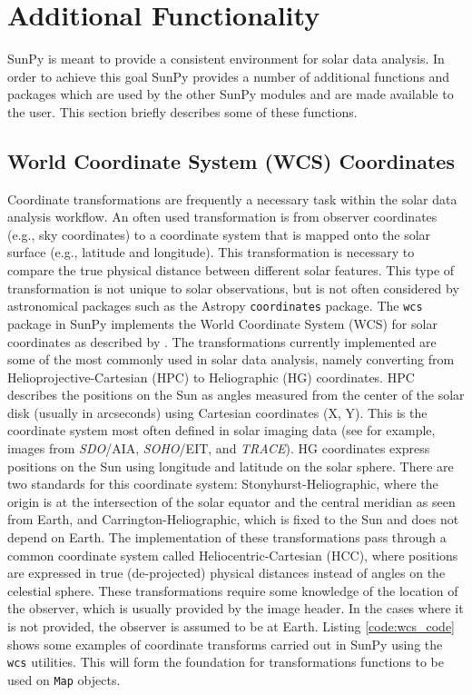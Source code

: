\section{Additional Functionality}\label{sec:util}
SunPy is meant to provide a consistent environment for solar data analysis. In 
order to achieve this goal SunPy provides a number of additional functions and packages which 
are used by the other SunPy modules and are made available to the user. This section 
briefly describes some of these functions.
	
\subsection{World Coordinate System (WCS) Coordinates}\label{ssec:util:wcs}
Coordinate transformations are frequently a necessary task within the solar 
data analysis workflow. An often used transformation is from 
observer coordinates (e.g., sky coordinates) to a coordinate system that is 
mapped onto the solar surface (e.g., latitude and longitude). This 
transformation is necessary to compare the true physical distance between 
different solar features. This type of transformation is not unique
to solar observations, but is not often considered by astronomical packages
such as the Astropy 
\texttt{coordinates} package. The \texttt{wcs} package in SunPy implements the World Coordinate 
System (WCS) for solar coordinates as described by \cite{thompson2006}. The 
transformations currently implemented are some of the most commonly used in solar data analysis, namely converting from Helioprojective-Cartesian 
(HPC) to Heliographic (HG) coordinates. HPC describes the positions on 
the Sun as angles measured from the center of the solar disk (usually in 
arcseconds) using Cartesian coordinates (X, Y). This is the coordinate system 
most often defined in solar imaging data (see for example, images from 
\textit{SDO}/AIA, \textit{SOHO}/EIT, and \textit{TRACE}). 
HG coordinates express positions on the Sun using longitude and latitude on 
the solar sphere. There are two standards for this coordinate system:
Stonyhurst-Heliographic, where the origin is at the intersection of the solar 
equator and the central meridian as seen from Earth, and 
Carrington-Heliographic, which is fixed to the Sun and does not depend on Earth. The 
implementation of these transformations pass through a common coordinate system 
called Heliocentric-Cartesian (HCC), where positions are expressed in true 
(de-projected) physical distances instead of angles on the celestial sphere.
These transformations require some knowledge of the location of the observer, 
which is usually provided by the image header. In the cases where it is 
not provided, the observer is assumed to be at Earth. Listing \ref{code:wcs_code} shows 
some examples of coordinate transforms carried out in SunPy using the 
\texttt{wcs} utilities. This will form the foundation for transformations functions
to be used on \texttt{Map} objects.

